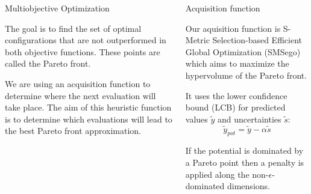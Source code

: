 \documentclass[final]{beamer}
\newlength{\onecolwid}
\newlength{\twocolwid}
\begin{document}
\begin{frame}[t]
\begin{columns}[t]
\begin{column}{\twocolwid}
\begin{columns}[t,totalwidth=\twocolwid]
\begin{column}{\onecolwid}
\begin{block}{Multiobjective Optimization}

The goal is to find the set of optimal configurations that are not outperformed in both objective functions. These points are called the Pareto front.

We are using an acquisition function to determine where the next evaluation will take place. The aim of this heuristic function is to determine which evaluations will lead to the best Pareto front approximation.

\end{block}


\end{column} %

\begin{column}{\onecolwid}\vspace{-.6in} %


\begin{block}{Acquisition function}

Our aquisition function is S-Metric Selection-based Efficient Global Optimization (SMSego) which aims to maximize the hypervolume of the Pareto front.

It uses the lower confidence bound (LCB) for predicted values $\tilde{y}$ and uncertainties $\tilde{s}$: $$\tilde{y}_{pot} = \tilde{y} - \alpha \tilde{s}$$

If the potential is dominated by a Pareto point then a penalty is applied along the non-$\epsilon$-dominated dimensions.


\end{block}


\end{column} %

\end{columns} %



\end{column}
\end{columns}
\end{frame}
\end{document}
